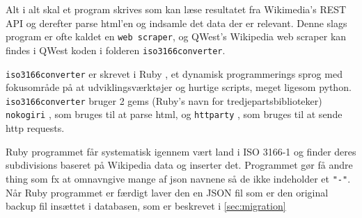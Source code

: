 Alt i alt skal et program skrives som kan læse resultatet fra Wikimedia's REST API og derefter parse html'en og indsamle det data der er relevant. 
Denne slags program er ofte kaldet en \texttt{web scraper}, og QWest's Wikipedia web scraper kan findes i QWest koden i folderen \texttt{iso3166converter}.

\texttt{iso3166converter} er skrevet i Ruby \cite{RubyLang}, et dynamisk programmerings sprog med fokusområde på at udviklingsværktøjer og hurtige scripts, meget ligesom python. \texttt{iso3166converter} bruger 2 gems (Ruby's navn for tredjepartsbiblioteker) \texttt{nokogiri} \cite{nokogiri}, som bruges til at parse html, og \texttt{httparty} \cite{httparty}, som bruges til at sende http requests.

Ruby programmet får systematisk igennem vært land i ISO 3166-1 og finder deres subdivisions baseret på Wikipedia data og inserter det. Programmet gør få andre thing som fx at omnavngive mange af json navnene så de ikke indeholder et \texttt{"-"}. Når Ruby programmet er færdigt laver den en JSON fil som er den original backup fil insættet i databasen, som er beskrevet i \ref{sec:migration}
